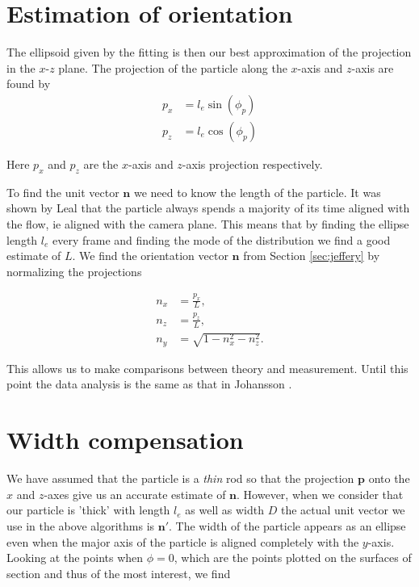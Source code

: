 \section{Estimation of orientation}

The ellipsoid given by the fitting is then our best approximation of the projection in the $x$-$z$ plane. The projection of the particle along the $x$-axis and $z$-axis are found by
\begin{align} \label{eq:project}
p_x  &= l_e \sin(\phi_p) \\
p_z  &= l_e \cos(\phi_p) 
\end{align}

Here $p_x$ and $p_z$ are the $x$-axis and $z$-axis projection respectively.

To find the unit vector $\mathbf{n}$ we need to know the length of the particle. It was shown by Leal \cite{Leal} that the particle always spends a majority of its time aligned with the flow, ie aligned with the camera plane. This means that by finding the ellipse length $l_e$ every frame and finding the mode of the distribution we find a good estimate of $L$. We find the orientation vector $\mathbf{n}$ from Section \ref{sec:jeffery} by normalizing the projections

\begin{subequations}\label{eq:normalize}
\begin{align}
n_x 	&= \frac{p_x}{L}, \\
n_z 	&= \frac{p_z}{L}, \\
n_y		&= \sqrt{1 - n_x^2 - n_z^2}.
\end{align}
\end{subequations}

This allows us to make comparisons between theory and measurement. Until this point the data analysis is the same as that in Johansson \cite{AntonThesis}.

\section{Width compensation}\label{sec:width_compensation}
We have assumed that the particle is a \emph{thin} rod so that the projection $\mathbf{p}$ onto the $x$ and $z$-axes give us an accurate estimate of $\mathbf{n}$. However, when we consider that our particle is 'thick' with length $l_e$ as well as width $D$ the actual unit vector we use in the above algorithms is $\mathbf{n}'$. The width of the particle appears as an ellipse even when the major axis of the particle is aligned completely with the $y$-axis. Looking at the points when $\phi = 0$, which are the points plotted on the surfaces of section and thus of the most interest, we find

